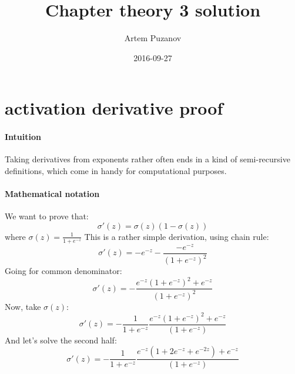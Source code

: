 \documentclass{article}
\title{Chapter theory 3 solution}
\date{2016-09-27}
\author{Artem Puzanov}
\begin{document}
\maketitle
{}
\newpage
{}

\section{activation derivative proof}
\paragraph{Intuition}
Taking derivatives from exponents rather often ends in a kind of semi-recursive definitions, which come in handy for computational purposes.
\paragraph{Mathematical notation}
We want to prove that:
$$\sigma'(z) = \sigma(z)(1 - \sigma(z))$$
where $\sigma(z) = \frac{1}{1+e^{-z}}$
This is a rather simple derivation, using chain rule:
$$\sigma'(z) = -e^{-z} -\frac{-e^{-z}}{(1 + e^{-z})^2}$$
Going for common denominator:
$$\sigma'(z) = - \frac{e^{-z}(1 + e^{-z})^2 + e^{-z}}{(1+e^{-z})^2}$$
Now, take $\sigma(z)$:
$$\sigma'(z) = - \frac{1}{1+e^{-z}}\frac{e^{-z}(1 + e^{-z})^2 + e^{-z}}{(1+e^{-z})}$$
And let's solve the second half:
$$\sigma'(z) = - \frac{1}{1+e^{-z}}\frac{e^{-z}(1 + 2e^{-z} + e^{-2z}) + e^{-z}}{(1+e^{-z})}$$
\end{document}
